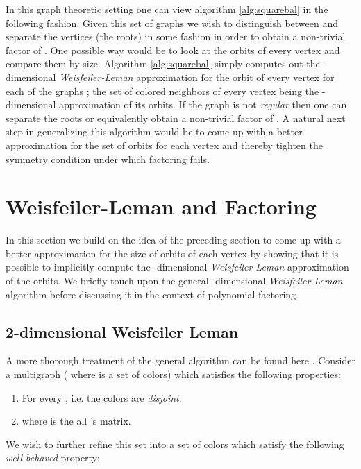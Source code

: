 In this graph theoretic setting one can view algorithm \ref{alg:squarebal} in the following fashion. Given this set of graphs we wish to distinguish between and separate the vertices (the roots) in some fashion in order to obtain
a non-trivial
factor of . One possible way would be to look at the orbits of every vertex and compare them by size. Algorithm \ref{alg:squarebal} simply computes out the -dimensional \emph{Weisfeiler-Leman} approximation for the orbit 
of every vertex for each of the graphs ; the set of  colored neighbors of every vertex being the -dimensional approximation of its orbits. If the graph  is not \emph{regular} then
one can separate the roots or equivalently obtain a non-trivial factor of . A natural next step in generalizing this 
algorithm would be to come up with a better approximation for the set of orbits for each vertex and thereby tighten the symmetry condition under which factoring fails. 

\section{Weisfeiler-Leman and Factoring}\label{sec:weisfeiler}

In this section we build on the idea of the preceding section to come up with a better approximation for the size of orbits of each vertex by showing that it is possible to implicitly compute the -dimensional 
\emph{Weisfeiler-Leman} approximation of the orbits. We briefly touch upon the general -dimensional \emph{Weisfeiler-Leman} algorithm before discussing it in the context of polynomial factoring.

\subsection{2-dimensional Weisfeiler Leman}
A more thorough treatment of the general algorithm can be found here \cite{barbados}. Consider a multigraph  ( where  is a set of colors) which satisfies the following properties:

  \begin{enumerate}
	  \item For every , i.e. the colors are \emph{disjoint}.

	  \item  where  is the all 's matrix.

  \end{enumerate}

  We wish to further refine this set into a set of colors  which satisfy the following \emph{well-behaved} property:

